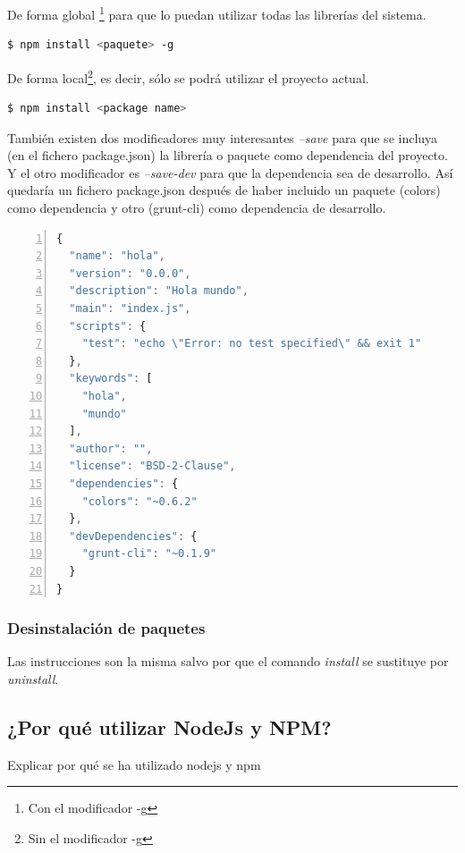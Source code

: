 De forma global \footnote{Con el modificador -g} para que lo puedan utilizar todas las librerías del sistema.

\begin{lstlisting}[language=bash, numbers=none]
$ npm install <paquete> -g
\end{lstlisting}

De forma local\footnote{Sin el modificador -g}, es decir, sólo se podrá utilizar el proyecto actual.

\begin{lstlisting}[language=bash, numbers=none]
$ npm install <package name>
\end{lstlisting}

También existen dos modificadores muy interesantes \textit{--save} para que se incluya (en el fichero package.json) la librería o paquete como dependencia del proyecto. Y el otro modificador es \textit{--save-dev} para que la dependencia sea de desarrollo. Así quedaría un fichero package.json después de haber incluido un paquete (colors) como dependencia y otro (grunt-cli) como dependencia de desarrollo.

\begin{lstlisting}[language=JavaScript, numbers=left]
{
  "name": "hola",
  "version": "0.0.0",
  "description": "Hola mundo",
  "main": "index.js",
  "scripts": {
    "test": "echo \"Error: no test specified\" && exit 1"
  },
  "keywords": [
    "hola",
    "mundo"
  ],
  "author": "",
  "license": "BSD-2-Clause",
  "dependencies": {
    "colors": "~0.6.2"
  },
  "devDependencies": {
    "grunt-cli": "~0.1.9"
  }
}
\end{lstlisting}

\subsubsection{Desinstalación de paquetes}

Las instrucciones son la misma salvo por que el comando \textit{install} se sustituye por \textit{uninstall}.

\subsection{¿Por qué utilizar NodeJs y NPM?}

Explicar por qué se ha utilizado nodejs y npm 